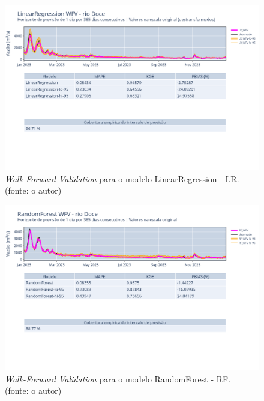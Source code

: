 \begin{figure}[!h]
\centering
\includegraphics[scale=0.33]{Figuras/rio_doce/wfv/LR/LR_WFV_LOG.png}
\caption{\textit{Walk-Forward Validation} para o modelo LinearRegression - LR.\\(fonte: o autor)}
\label{fig:doce_LR_WFV_LOG}
\end{figure}

\begin{figure}[!h]
\centering
\includegraphics[scale=0.33]{Figuras/rio_doce/wfv/RF/RF_WFV_ORIG.png}
\caption{\textit{Walk-Forward Validation} para o modelo RandomForest - RF.\\(fonte: o autor)}
\label{fig:doce_RF_WFV_ORIG}
\end{figure}
\clearpage

%

